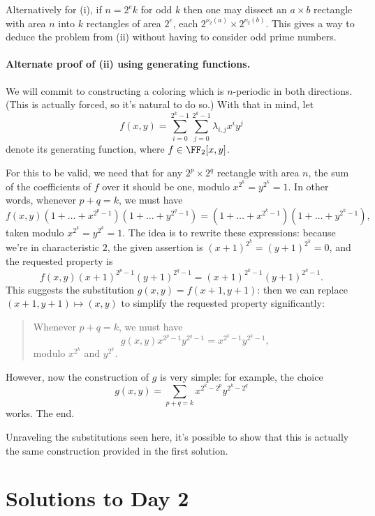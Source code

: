 \documentclass[11pt]{scrartcl}
\begin{document}
\begin{remark*}
  Alternatively for (i), if $n = 2^e k$ for odd $k$ then one may dissect
  an $a \times b$ rectangle with area $n$ into
  $k$ rectangles of area $2^e$, each $2^{\nu_2(a)} \times 2^{\nu_2(b)}$.
  This gives a way to deduce the problem from (ii)
  without having to consider odd prime numbers.
\end{remark*}

\paragraph{Alternate proof of (ii) using generating functions.}
We will commit to constructing a coloring which is $n$-periodic in both directions.
(This is actually forced, so it's natural to do so.)
With that in mind, let
\[ f(x, y) = \sum_{i=0}^{2^k-1} \sum_{j=0}^{2^k-1} \lambda_{i, j} x^i y^j \]
denote its generating function, where $f \in \FF_2[x, y]$.

For this to be valid, we need that for any $2^p \times 2^q$ rectangle with area $n$,
the sum of the coefficients of $f$ over it should be one, modulo $x^{2^k} = y^{2^k} = 1$.
In other words, whenever $p+q = k$, we must have
\[
  f(x, y) (1 + \dots + x^{2^p-1}) (1 + \dots + y^{2^q-1})
  = (1 + \dots + x^{2^k-1})(1 + \dots + y^{2^k-1}),
\]
taken modulo $x^{2^k} = y^{2^k} = 1$.
The idea is to rewrite these expressions:
because we're in characteristic $2$, the given assertion is $(x+1)^{2^k} = (y+1)^{2^k} = 0$,
and the requested property is
\[ f(x, y) (x+1)^{2^p-1} (y+1)^{2^q-1} = (x+1)^{2^k-1} (y+1)^{2^k-1}. \]
This suggests the substitution $g(x, y) = f(x+1, y+1)$:
then we can replace $(x+1, y+1) \mapsto (x, y)$ to simplify the requested property significantly:
\begin{quote}
  Whenever $p+q = k$, we must have
  \[ g(x, y) x^{2^p-1} y^{2^q-1} = x^{2^k-1} y^{2^k-1}, \]
  modulo $x^{2^k}$ and $y^{2^k}$.
\end{quote}
However, now the construction of $g$ is very simple: for example, the choice
\[ g(x, y) = \sum_{p+q=k} x^{2^k-2^p} y^{2^k-2^q} \]
works. The end.

\begin{remark*}
  Unraveling the substitutions seen here,
  it's possible to show that this is actually the
  same construction provided in the first solution.
\end{remark*}
\pagebreak

\section{Solutions to Day 2}
\end{document}
